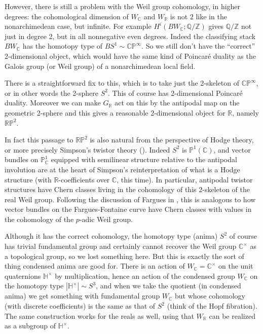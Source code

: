 \documentclass[12pt]{article}
\theoremstyle{definition}
\newcommand{\mbb}{\mathbb}
\begin{document}
However, there is still a problem with the Weil group cohomology, in higher degrees: the cohomological dimension of $W_\mbb{C}$ and $W_\mbb{R}$ is not $2$ like in the nonarchimedean case, but infinite.  For example $H^i(BW_\mbb{C};\mbb{Q}/\mbb{Z})$ gives $\mathbb{Q}/\mbb{Z}$ not just in degree 2, but in all nonnegative even degrees.  Indeed the classifying stack $BW_\mbb{C}$ has the homotopy type of $BS^1 \sim \mbb{C}\mbb{P}^\infty$.  So we still don't have the ``correct'' 2-dimensional object, which would have the same kind of Poincaré duality as the Galois group (or Weil group) of a nonarchimedean local field.

There is a straightforward fix to this, which is to take just the 2-skeleton of $\mbb{C}\mbb{P}^\infty$, or in other words the 2-sphere $S^2$.  This of course has 2-dimensional Poincaré duality.  Moreover we can make $G_\mbb{R}$ act on this by the antipodal map on the geometric 2-sphere and this gives a reasonable 2-dimensional object for $\mbb{R}$, namely $\mbb{R}\mbb{P}^2$.

In fact this passage to $\mbb{R}\mbb{P}^2$ is also natural from the perspective of Hodge theory, or more precisely Simpson's twistor theory (\cite{simpson}).  Indeed $S^2$ is $\mbb{P}^1(\mbb{C})$, and vector bundles on $\mbb{P}^1_\mbb{C}$ equipped with semilinear structure relative to the antipodal involution are at the heart of Simpson's reinterpretation of what is a Hodge structure (with $\mbb{R}$-coefficients over $\mbb{C}$, this time).  In particular, antipodal twistor structures have Chern classes living in the cohomology of this 2-skeleton of the real Weil group. Following the discussion of Fargues in \cite{farguescft}, this is analogous to how vector bundles on the Fargues-Fontaine curve have Chern classes with values in the cohomology of the $p$-adic Weil group.

Although it has the correct cohomology, the homotopy type (anima) $S^2$ of course has trivial fundamental group and certainly cannot recover the Weil group $\mbb{C}^\times$ as a topological group, so we lost something here.  But this is exactly the sort of thing condensed anima are good for.  There is an action of $W_\mbb{C}=\mbb{C}^\times$ on the unit quaternions $\mbb{H}^\times$ by multiplication, hence an action of the condensed group $W_\mbb{C}$ on the homotopy type $|\mbb{H}^\times|\sim S^3$, and when we take the quotient (in condensed anima) we get something with fundamental group $W_\mbb{C}$ but whose cohomology (with discrete coefficients) is the same as that of $S^2$ (think of the Hopf fibration).  The same construction works for the reals as well, using that $W_\mbb{R}$ can be realized as a subgroup of $\mbb{H}^\times$.
\end{document}
